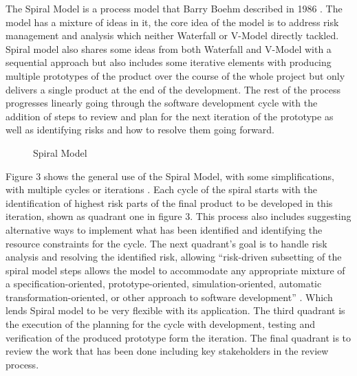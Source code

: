 \documentclass{style/CRPITStyle}
\renewcommand{\cite}{\citep}
\begin{document}
The Spiral Model is a process model that Barry Boehm described in 1986 \cite{boehm:1988:spiral}.
The model has a mixture of ideas in it, the core idea of the model is to address risk management and analysis
which neither Waterfall or V-Model directly tackled.
Spiral model also shares some ideas from both Waterfall and V-Model with a sequential approach 
but also includes some iterative elements with producing multiple prototypes of the 
product over the course of the whole project but only delivers a single product
at the end of the development.
The rest of the process progresses linearly going through the software 
development cycle with the addition of steps to review and plan for
the next iteration of the prototype as well as identifying risks and
how to resolve them going forward.

\vspace{.1in}
\begin{figure}[htb]
\caption{\protect\label{spiral}  Spiral Model}
\end{figure}

\vspace{.1in}

Figure 3 shows the general use of the Spiral Model, with some simplifications, 
with multiple cycles or iterations \cite{boehm:1988:spiral}.
Each cycle of the spiral starts with the identification of highest risk parts of the
final product to be developed in this iteration, shown as quadrant one in figure 3. 
This process also includes suggesting alternative ways to implement what
has been identified and
identifying the resource constraints for the cycle.
The next quadrant's goal is to handle risk analysis and resolving the identified
risk, allowing ``risk-driven subsetting of the spiral model steps allows the model 
to accommodate any appropriate mixture of a specification-oriented, 
prototype-oriented, simulation-oriented, automatic transformation-oriented, 
or other approach to software development'' \cite{boehm:1988:spiral}.
Which lends Spiral model to be very flexible with its application.
The third quadrant is the execution of the planning for the cycle with
development, testing and verification of the produced prototype form the
iteration. 
The final quadrant is to review the work that has been done including key
stakeholders in the review process.
\end{document}
